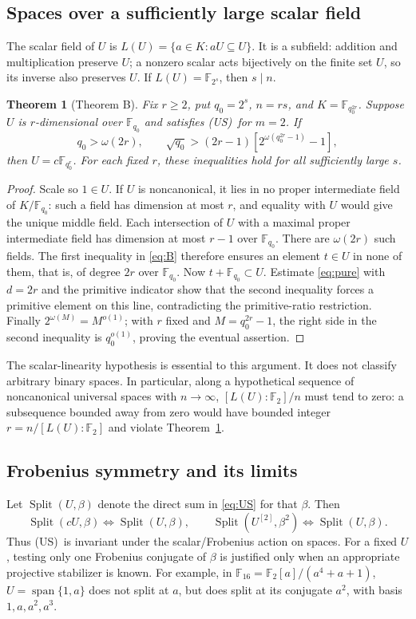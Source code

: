 \documentclass[11pt,a4paper]{article}
\newtheorem{theorem}{Theorem}[section]
\theoremstyle{definition}\newtheorem{definition}[theorem]{Definition}
\theoremstyle{remark}\newtheorem{remark}[theorem]{Remark}
\newcommand{\F}{\mathbb F}
\newcommand{\Span}{\operatorname{span}}
\newcommand{\Split}{\operatorname{Split}}
\newcommand{\US}{\textup{(US)}}
\numberwithin{equation}{section}
\begin{document}
\subsection{Spaces over a sufficiently large scalar field}
The scalar field of $U$ is $L(U)=\{a\in K:aU\subseteq U\}$. It is a subfield: addition and multiplication preserve $U$; a nonzero scalar acts bijectively on the finite set $U$, so its inverse also preserves $U$. If $L(U)=\F_{2^s}$, then $s\mid n$.

\begin{theorem}[Theorem B]\label{thm:B}
Fix $r\ge2$, put $q_0=2^s$, $n=rs$, and $K=\F_{q_0^{2r}}$. Suppose $U$ is $r$-dimensional over $\F_{q_0}$ and satisfies \US\ for $m=2$. If
\begin{equation}\label{eq:B}
q_0>\omega(2r),\qquad
\sqrt{q_0}>(2r-1)[2^{\omega(q_0^{2r}-1)}-1],
\end{equation}
then $U=c\F_{q_0^r}$. For each fixed $r$, these inequalities hold for all sufficiently large $s$.
\end{theorem}
\begin{proof}
Scale so $1\in U$. If $U$ is noncanonical, it lies in no proper intermediate field of $K/\F_{q_0}$: such a field has dimension at most $r$, and equality with $U$ would give the unique middle field. Each intersection of $U$ with a maximal proper intermediate field has dimension at most $r-1$ over $\F_{q_0}$. There are $\omega(2r)$ such fields. The first inequality in \eqref{eq:B} therefore ensures an element $t\in U$ in none of them, that is, of degree $2r$ over $\F_{q_0}$. Now $t+\F_{q_0}\subset U$. Estimate \eqref{eq:pure} with $d=2r$ and the primitive indicator show that the second inequality forces a primitive element on this line, contradicting the primitive-ratio restriction. Finally $2^{\omega(M)}=M^{o(1)}$; with $r$ fixed and $M=q_0^{2r}-1$, the right side in the second inequality is $q_0^{o(1)}$, proving the eventual assertion.
\end{proof}
The scalar-linearity hypothesis is essential to this argument. It does not classify arbitrary binary spaces. In particular, along a hypothetical sequence of noncanonical universal spaces with $n\to\infty$, $[L(U):\F_2]/n$ must tend to zero: a subsequence bounded away from zero would have bounded integer $r=n/[L(U):\F_2]$ and violate Theorem~\ref{thm:B}.

\subsection{Frobenius symmetry and its limits}
Let $\Split(U,\beta)$ denote the direct sum in \eqref{eq:US} for that $\beta$. Then
\begin{equation}\label{eq:frob}
\Split(cU,\beta)\Longleftrightarrow\Split(U,\beta),\qquad
\Split(U^{[2]},\beta^2)\Longleftrightarrow\Split(U,\beta).
\end{equation}
Thus \US\ is invariant under the scalar/Frobenius action on spaces. For a fixed $U$, testing only one Frobenius conjugate of $\beta$ is justified only when an appropriate projective stabilizer is known. For example, in $\F_{16}=\F_2[a]/(a^4+a+1)$, $U=\Span\{1,a\}$ does not split at $a$, but does split at its conjugate $a^2$, with basis $1,a,a^2,a^3$.
\end{document}
